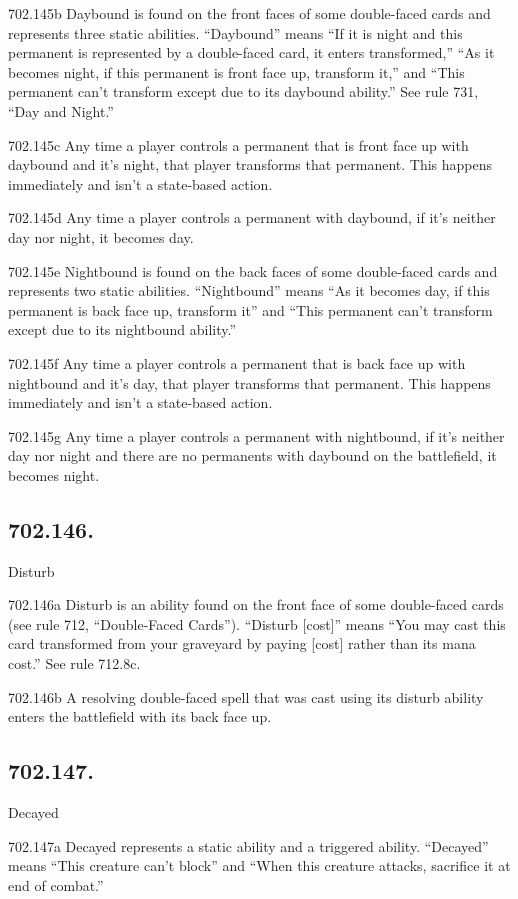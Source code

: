 702.145b Daybound is found on the front faces of some double-faced cards and represents three static abilities. “Daybound” means “If it is night and this permanent is represented by a double-faced card, it enters transformed,” “As it becomes night, if this permanent is front face up, transform it,” and “This permanent can’t transform except due to its daybound ability.” See rule 731, “Day and Night.”

702.145c Any time a player controls a permanent that is front face up with daybound and it’s night, that player transforms that permanent. This happens immediately and isn’t a state-based action.

702.145d Any time a player controls a permanent with daybound, if it’s neither day nor night, it becomes day.

702.145e Nightbound is found on the back faces of some double-faced cards and represents two static abilities. “Nightbound” means “As it becomes day, if this permanent is back face up, transform it” and “This permanent can’t transform except due to its nightbound ability.”

702.145f Any time a player controls a permanent that is back face up with nightbound and it’s day, that player transforms that permanent. This happens immediately and isn’t a state-based action.

702.145g Any time a player controls a permanent with nightbound, if it’s neither day nor night and there are no permanents with daybound on the battlefield, it becomes night.

\subsection*{702.146.}
Disturb

702.146a Disturb is an ability found on the front face of some double-faced cards (see rule 712, “Double-Faced Cards”). “Disturb [cost]” means “You may cast this card transformed from your graveyard by paying [cost] rather than its mana cost.” See rule 712.8c.

702.146b A resolving double-faced spell that was cast using its disturb ability enters the battlefield with its back face up.

\subsection*{702.147.}
Decayed

702.147a Decayed represents a static ability and a triggered ability. “Decayed” means “This creature can’t block” and “When this creature attacks, sacrifice it at end of combat.”

